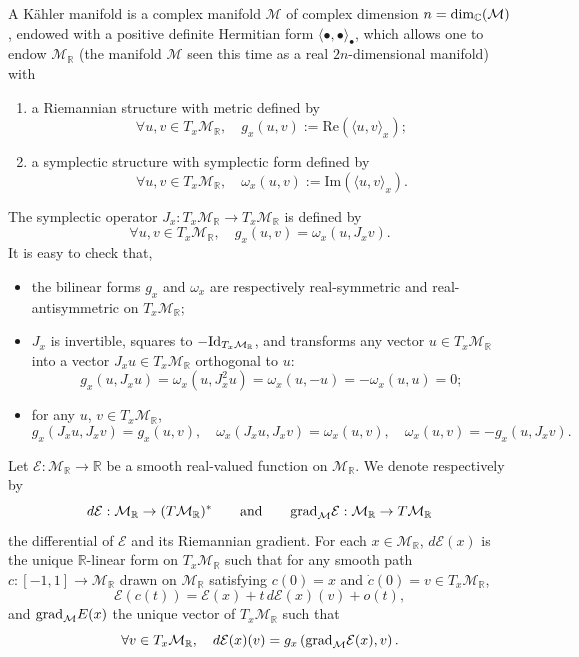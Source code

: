 \documentclass[11pt]{article}
\def\R{{\mathbb R}}
\def\C{{\mathbb C}}
\begin{document}
\par A K\"ahler manifold is a complex manifold $\mathcal M$ of complex dimension $n={\rm dim}_\C(\mathcal M)$, endowed with a positive definite Hermitian form $\langle \bullet,\bullet \rangle_\bullet$, which allows one to endow $\mathcal M_\R$ (the manifold $\mathcal M$ seen this time as a real $2n$-dimensional manifold) with
\begin{enumerate}
\item a Riemannian structure with metric defined by
$$
\forall u,v \in T_x\mathcal M_\R, \quad g_x(u,v) := \mbox{Re}(\langle u,v \rangle_x);
$$
\item a symplectic structure with symplectic form defined by 
$$
\forall u,v \in T_x\mathcal M_\R, \quad \omega_x(u,v) := \mbox{Im}(\langle u,v \rangle_x).
$$
\end{enumerate}
The symplectic operator $J_x:T_x\mathcal M_\R \to T_x \mathcal M_\R$ is defined by
$$
\forall u,v \in T_x\mathcal M_\R, \quad g_x(u,v)= \omega_x(u,J_xv).
$$ 
It is easy to check that, 
\begin{itemize}
    \item the bilinear forms $g_x$ and $\omega_x$ are respectively real-symmetric and real-antisymmetric on $T_x\mathcal M_\R$;
    \item $J_x$ is invertible, squares to $-{\rm Id}_{T_x\mathcal M_{\R}}$, and transforms any vector $u \in T_x\mathcal M_\R$ into a vector $J_xu \in T_x\mathcal M_\R$ orthogonal to $u$:
    \begin{equation}\label{eq:Jxu_ortho_u}
    g_x(u,J_x u)= \omega_x(u,J_x^2u) = \omega_x(u,-u) = - \omega_x(u,u)=0;
    \end{equation}
    \item for any $u$, $v\in T_x\mathcal{M}_{\R}$, 
\begin{equation}
    \label{eqn:properties of Kahler manifold}
    g_x(J_x u,J_x v)=g_x(u,v),\quad \omega_x(J_x u,J_x v)=\omega_x(u,v),\quad \omega_x(u,v)=-g_x(u,J_x v).
\end{equation}
\end{itemize}

\par Let $\mathcal E:\mathcal M_\R \to \R$ be a smooth real-valued function on $\mathcal M_\R$. We denote respectively by 
$$
d\mathcal E: \mathcal M_\R \to (T\mathcal M_\R)^* \qquad \mbox{and} \qquad {\rm grad}_{\mathcal M} \mathcal E: \mathcal M_\R \to T\mathcal M_\R
$$
the differential of $\mathcal E$ and its Riemannian gradient. For each $x \in \mathcal M_\R$, $d\mathcal E(x)$ is the unique $\R$-linear form on $T_x\mathcal M_\R$ such that for any smooth path $c:[-1,1] \to \mathcal M_\R$ drawn on $\mathcal M_\R$ satisfying $c(0)=x$ and $\dot c(0)=v \in T_x\mathcal M_\R$,
$$
\mathcal E(c(t))=\mathcal E(x) + t \, d\mathcal E(x)(v)+o(t),
$$
and ${\rm grad}_{\mathcal M}E(x)$ the unique vector of $T_x\mathcal M_\R$ such that
$$
\forall v \in T_x\mathcal M_\R, \quad d\mathcal E(x)(v) = g_x\left({\rm grad}_{\mathcal M}\mathcal E(x),v\right).
$$
\end{document}
